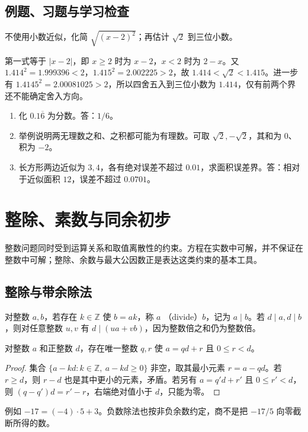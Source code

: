 \documentclass[UTF8]{ctexbook}
\begin{document}
\section{例题、习题与学习检查}
\begin{example}
不使用小数近似，化简 $\sqrt{(x-2)^2}$；再估计 $\sqrt2$ 到三位小数。
\end{example}
\begin{solve}
第一式等于 $|x-2|$，即 $x\ge2$ 时为 $x-2$，$x<2$ 时为 $2-x$。又 $1.414^2=1.999396<2$，$1.415^2=2.002225>2$，故 $1.414<\sqrt2<1.415$。进一步有 $1.4145^2=2.00081025>2$，所以四舍五入到三位小数为 $1.414$，仅有前两个界还不能确定舍入方向。
\end{solve}
\begin{enumerate}
\item 化 $0.1\overline6$ 为分数。答：$1/6$。
\item 举例说明两无理数之和、之积都可能为有理数。可取 $\sqrt2,-\sqrt2$，其和为 $0$、积为 $-2$。
\item 长方形两边近似为 $3,4$，各有绝对误差不超过 $0.01$，求面积误差界。答：相对于近似面积 $12$，误差不超过 $0.0701$。
\end{enumerate}

\chapter{整除、素数与同余初步}
\label{chap:em-integers}
整数问题同时受到运算关系和取值离散性的约束。方程在实数中可解，并不保证在整数中可解；整除、余数与最大公因数正是表达这类约束的基本工具。

\section{整除与带余除法}
对整数 $a,b$，若存在 $k\in\mathbb Z$ 使 $b=ak$，称 $a$ （divide）$b$，记为 $a\mid b$。若 $d\mid a,d\mid b$，则对任意整数 $u,v$ 有 $d\mid(ua+vb)$，因为整数倍之和仍为整数倍。

\begin{theorem}[带余除法]
对整数 $a$ 和正整数 $d$，存在唯一整数 $q,r$ 使 $a=qd+r$ 且 $0\le r<d$。
\end{theorem}
\begin{proof}
集合 $\{a-kd:k\in\mathbb Z,\ a-kd\ge0\}$ 非空，取其最小元素 $r=a-qd$。若 $r\ge d$，则 $r-d$ 也是其中更小的元素，矛盾。若另有 $a=q'd+r'$ 且 $0\le r'<d$，则 $(q-q')d=r'-r$，右端绝对值小于 $d$，只能为零。
\end{proof}
例如 $-17=(-4)\cdot5+3$。负数除法也按非负余数约定，商不是把 $-17/5$ 向零截断所得的数。
\end{document}
